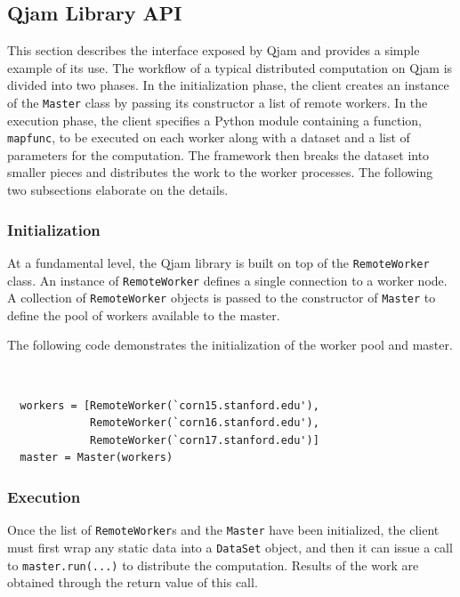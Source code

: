 \documentclass[%
  final,
  notitlepage,
  narroweqnarray,
  inline,
]{ieee}
\begin{document}
\subsection{Qjam Library API}
\label{Library}

This section describes the interface exposed by Qjam and provides a simple
example of its use. The workflow of a typical distributed computation on Qjam
is divided into two phases. In the initialization phase, the client creates an
instance of the \texttt{Master} class by passing its constructor a list of
remote workers. In the execution phase, the client specifies a Python module
containing a function, \texttt{mapfunc}, to be executed on each worker along
with a dataset and a list of parameters for the computation. The framework then
breaks the dataset into smaller pieces and distributes the work to the worker
processes. The following two subsections elaborate on the details.

\subsubsection{Initialization}

At a fundamental level, the Qjam library is built on top of the
\texttt{RemoteWorker} class. An instance of \texttt{RemoteWorker} defines a
single connection to a worker node. A collection of \texttt{RemoteWorker}
objects is passed to the constructor of \texttt{Master} to define the pool of
workers available to the master.

The following code demonstrates the initialization of the worker pool and
master.

{\tt \small
\begin{verbatim}
  workers = [RemoteWorker(`corn15.stanford.edu'),
             RemoteWorker(`corn16.stanford.edu'),
             RemoteWorker(`corn17.stanford.edu')]
  master = Master(workers)
\end{verbatim}}

\subsubsection{Execution}

Once the list of \texttt{RemoteWorker}s and the \texttt{Master} have been
initialized, the client must first wrap any static data into a \texttt{DataSet}
object, and then it can issue a call to \texttt{master.run(...)} to distribute
the computation. Results of the work are obtained through the return value of
this call.
\end{document}
